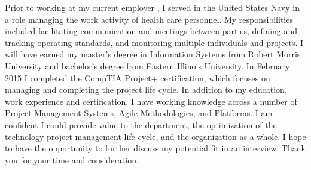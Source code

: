 \documentclass[9pt, a4paper]{awesome-cv}
\begin{document}
\begin{cvletter}
Prior to working at my current employer , I served in the  United States Navy in a role managing the work activity of health care personnel. My responsibilities included facilitating communication and meetings between parties, defining and tracking operating standards, and monitoring multiple individuals and projects. I will have earned my master’s degree in Information Systems from Robert Morris University and bachelor’s degree from Eastern Illinois University. In February 2015 I completed the CompTIA Project+ certification, which focuses on managing and completing the project life cycle. In addition to my education, work experience and certification, I have working knowledge across a number of Project Management Systems, Agile Methodologies, and Platforms. I am confident I could provide value to the department, the optimization of the technology project management life cycle, and the organization as a whole. I hope to have the opportunity to further discuss my potential fit in an interview. Thank you for your time and consideration.

\end{cvletter}

\makeletterclosing
\end{document}
